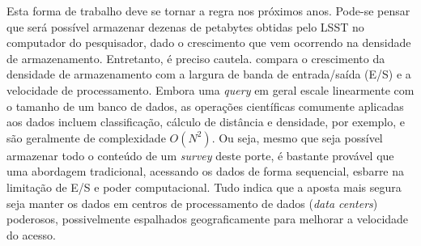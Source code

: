 Esta forma de trabalho deve se tornar a regra nos próximos anos. Pode-se pensar
que será possível armazenar dezenas de petabytes obtidas pelo LSST no computador
do pesquisador, dado o crescimento que vem ocorrendo na densidade de
armazenamento. Entretanto, é preciso cautela. \citet{Way2011} compara o
crescimento da densidade de armazenamento com a largura de banda de
entrada/saída (E/S) e a velocidade de processamento. Embora uma {\em query} em
geral escale linearmente com o tamanho de um banco de dados, as operações
científicas comumente aplicadas aos dados incluem classificação, cálculo de
distância e densidade, por exemplo, e são geralmente de complexidade $O(N^2)$.
Ou seja, mesmo que seja possível armazenar todo o conteúdo de um {\em survey}
deste porte, é bastante provável que uma abordagem tradicional, acessando os
dados de forma sequencial, esbarre na limitação de E/S e poder computacional.
Tudo indica que a aposta mais segura seja manter os dados em centros de
processamento de dados ({\em data centers}) poderosos, possivelmente espalhados
geograficamente para melhorar a velocidade do acesso.

